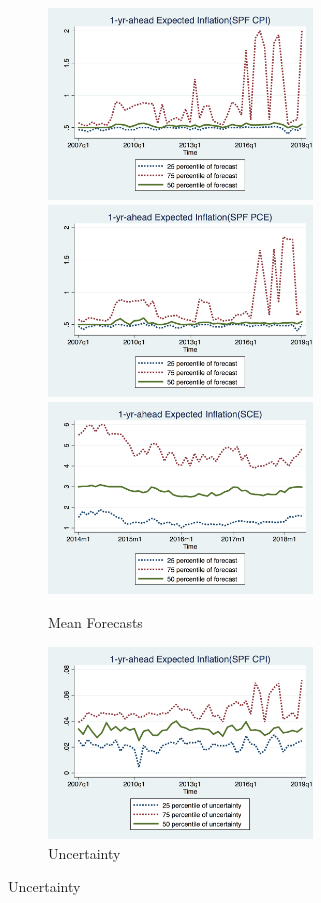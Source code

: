 \documentclass[]{article}
\begin{document}
	
	\begin{figure}[ht]
		\begin{subfigure}[b]{0.5\textwidth}
		\centering
		\caption{Mean Forecasts}
		\includegraphics[width=7cm]{figures/IQRmeanCPIQ.png} 
		\smallskip
		\includegraphics[width=7cm]{figures/IQRmeanPCEQ.png}
		\smallskip
		\includegraphics[width=7cm]{figures/IQRmeanSCEM.png}
		\end{subfigure}
	    \hfill 
		\begin{subfigure}[b]{0.5\textwidth}
		\centering 
		\caption{Uncertainty}
		\includegraphics[width=7cm]{figures/IQRvarCPIQ.png}

\end{subfigure}
\end{figure}
\end{document}
